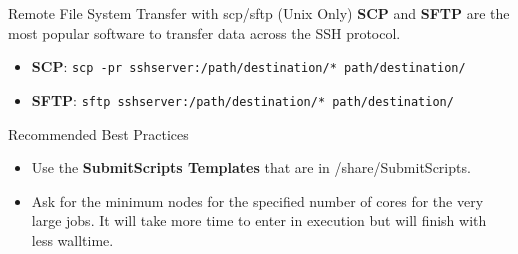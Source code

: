 \documentclass[final,t]{beamer}
\begin{document}
\begin{frame}[fragile]{}
\begin{columns}[t]
\begin{column}{.32\linewidth}
      \begin{block}{Remote File System Transfer with scp/sftp (Unix Only)}
       \textbf{SCP} and \textbf{SFTP} are the most popular software to transfer data across the SSH protocol.
        \begin{itemize}
        \item \textbf{SCP}: \verb|scp -pr sshserver:/path/destination/* path/destination/|
        \item \textbf{SFTP}: \verb|sftp sshserver:/path/destination/* path/destination/|
        \end{itemize}
      \end{block}

      \begin{block}{Recommended Best Practices}
      \begin{itemize}
         \item Use the \textbf{SubmitScripts Templates} that are in /share/SubmitScripts.
         \item Ask for the minimum nodes for the specified number of cores for the very large jobs. It will take more time to enter in execution but will finish with less walltime.
        \end{itemize}
      \end{block}
 
    \end{column}
  \end{columns}
\end{frame}
\end{document}
